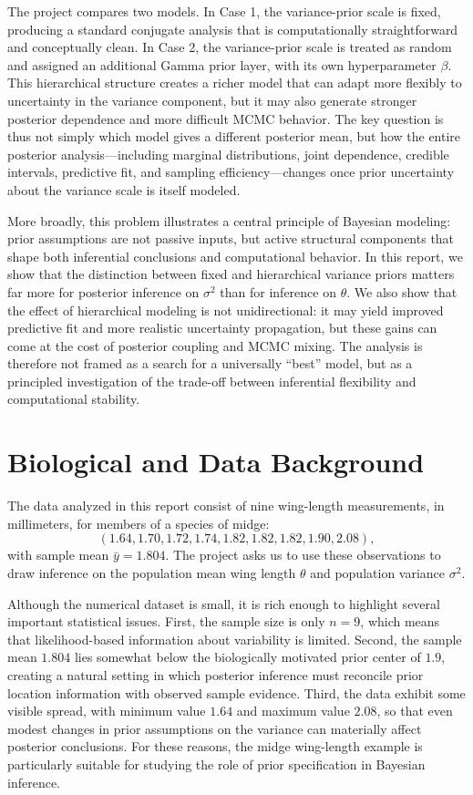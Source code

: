 \documentclass[11pt]{article}
\begin{document}
The project compares two models. In Case 1, the variance-prior scale is fixed, producing a standard conjugate analysis that is computationally straightforward and conceptually clean. In Case 2, the variance-prior scale is treated as random and assigned an additional Gamma prior layer, with its own hyperparameter $\beta$. This hierarchical structure creates a richer model that can adapt more flexibly to uncertainty in the variance component, but it may also generate stronger posterior dependence and more difficult MCMC behavior. The key question is thus not simply which model gives a different posterior mean, but how the entire posterior analysis---including marginal distributions, joint dependence, credible intervals, predictive fit, and sampling efficiency---changes once prior uncertainty about the variance scale is itself modeled.

More broadly, this problem illustrates a central principle of Bayesian modeling: prior assumptions are not passive inputs, but active structural components that shape both inferential conclusions and computational behavior. In this report, we show that the distinction between fixed and hierarchical variance priors matters far more for posterior inference on $\sigma^2$ than for inference on $\theta$. We also show that the effect of hierarchical modeling is not unidirectional: it may yield improved predictive fit and more realistic uncertainty propagation, but these gains can come at the cost of posterior coupling and MCMC mixing. The analysis is therefore not framed as a search for a universally ``best'' model, but as a principled investigation of the trade-off between inferential flexibility and computational stability.

\section{Biological and Data Background}

The data analyzed in this report consist of nine wing-length measurements, in millimeters, for members of a species of midge:
\[
(1.64, 1.70, 1.72, 1.74, 1.82, 1.82, 1.82, 1.90, 2.08),
\]
with sample mean $\bar y = 1.804$. The project asks us to use these observations to draw inference on the population mean wing length $\theta$ and population variance $\sigma^2$.

Although the numerical dataset is small, it is rich enough to highlight several important statistical issues. First, the sample size is only $n=9$, which means that likelihood-based information about variability is limited. Second, the sample mean $1.804$ lies somewhat below the biologically motivated prior center of $1.9$, creating a natural setting in which posterior inference must reconcile prior location information with observed sample evidence. Third, the data exhibit some visible spread, with minimum value $1.64$ and maximum value $2.08$, so that even modest changes in prior assumptions on the variance can materially affect posterior conclusions. For these reasons, the midge wing-length example is particularly suitable for studying the role of prior specification in Bayesian inference.
\end{document}
